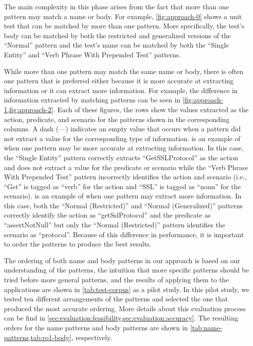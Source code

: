 The main complexity in this phase arises from the fact that more than one pattern may match a name or body.
% 
For example, \cref{fig:approach-0} shows a unit test that can be matched by more than one pattern.
%
More specifically, the test's body can be matched by both the restricted and generalized versions of the \enquote{Normal} pattern and the test's name can be matched by both the \enquote{Single Entity} and \enquote{Verb Phrase With Prepended Test} patterns.


While more than one pattern may match the same name or body, there is often one pattern that is preferred either because it is more accurate at extracting information or it can extract more information.
%
For example, the difference in information extracted by matching patterns can be seen in \cref{fig:approach-1,fig:approach-2}.
%
Each of these figures, the rows show the values extracted as the action, predicate, and scenario for the patterns shown in the corresponding columns.
%
A dash (---) indicates an empty value that occurs when a pattern did not extract a value for the corresponding type of information.
%
 is an example of when one pattern may be more accurate at extracting information.
%
In this case, the \enquote{Single Entity} pattern correctly extracts \enquote{GetSSLProtocol} as the action and does not extract a value for the predicate or scenario while the \enquote{Verb Phrase With Prepended Test} pattern incorrectly identifies the action and scenario (i.e., \enquote{Get} is tagged as \enquote{verb} for the action and \enquote{SSL} is tagged as \enquote{noun} for the scenario).
%
 is an example of when one pattern may extract more information.
%
In this case, both the \enquote{Normal (Restricted)} and \enquote{Normal (Generalized)} patterns correctly identify the action as \enquote{getSslProtocol} and the predicate as \enquote{assertNotNull} but only the \enquote{Normal (Restricted)} pattern identifies the scenario as \enquote{protocol}.
%
Because of this difference in performance, it is important to order the patterns to produce the best results.


The ordering of both name and body patterns in our approach is based on our understanding of the patterns, the intuition that more specific patterns should be tried before more general patterns, and the results of applying them to the applications are shown in \cref{tab:test-corpus} as a pilot study.
%
In this pilot study, we tested ten different arrangements of the patterns and selected the one that produced the most accurate ordering.
%
More details about this evaluation process can be find in \cref{sec:evaluation:feasibility,sec:evaluation:accuracy}.
%
The resulting orders for the name patterns and body patterns are shown in \cref{tab:name-patterns,tab:rq1-body}, respectively.



